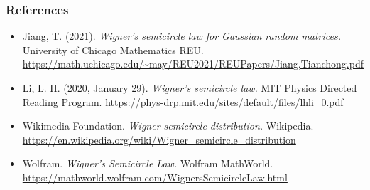\documentclass[handout, xcolor=dvipsnames]{beamer}
\begin{document}
\begin{frame}
	\frametitle{References} 
	\scriptsize
	\begin{itemize}
	\item Jiang, T. (2021). {\it Wigner's semicircle law for Gaussian random matrices.} University of Chicago Mathematics REU. \url{https://math.uchicago.edu/~may/REU2021/REUPapers/Jiang,Tianchong.pdf}

	\item Li, L. H. (2020, January 29). {\it Wigner's semicircle law.} MIT Physics Directed Reading Program. \url{https://phys-drp.mit.edu/sites/default/files/lhli_0.pdf}
    
	\item Wikimedia Foundation. {\it Wigner semicircle distribution.} Wikipedia. \url{https://en.wikipedia.org/wiki/Wigner_semicircle_distribution}
	
	\item Wolfram. {\it Wigner's Semicircle Law.} Wolfram MathWorld. \url{https://mathworld.wolfram.com/WignersSemicircleLaw.html}
	
	\end{itemize}
\end{frame}
\end{document}
